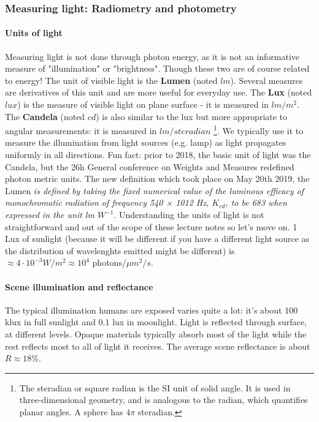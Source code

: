 \subsubsection{Measuring light: Radiometry and photometry}

\paragraph{Units of light} Measuring light is not done through photon energy, as it is not an informative measure of "illumination" or "brightness". Though these two are of course related to energy! 
The unit of visible light is the \textbf{Lumen} (noted $lm$). Several measures are derivatives of this unit and are more useful for everyday use. The \textbf{Lux} (noted $lux$) is the measure of visible light on plane surface - it is measured in $lm/m^2$. The \textbf{Candela} (noted $cd$) is also similar to the lux but more appropriate to angular measurements:  it is measured in $lm/steradian$ \footnote{The steradian or square radian is the SI unit of solid angle. It is used in three-dimensional geometry, and is analogous to the radian, which quantifies planar angles. A sphere has $4\pi$ steradian.}. We typically use it to measure the illumination from light sources (e.g. lamp) as light propagates uniformly in all directions. Fun fact: prior to 2018, the basic unit of light was the Candela, but the 26h General conference on Weights and Measures redefined photon metric units. The new definition which took place on May 20th 2019, the Lumen \textit{is defined by taking the fixed numerical value of the luminous efficacy of monochromatic radiation of frequency 540 × 1012 Hz, $K_{cd}$, to be 683 when expressed in the unit lm $W^{-1}$}. Understanding the units of light is not straightforward and out of the scope of these lecture notes so let's move on. 
1 Lux of sunlight (because it will be different if you have a different light source as the distribution of wavelenghts emitted might be different) is $\approx 4 \cdot 10^{-3} W/m^2 \approx 10^4$ photons/$ \mu m^2 /s$.

\paragraph{Scene illumination and reflectance}
The typical illumination humans are exposed varies quite a lot: it's about 100 klux in full sunlight and 0.1 lux in moonlight. Light is reflected through surface, at different levels. Opaque materials typically absorb most of the light while the rest reflects most to all of light it receives. The average scene reflectance is about $R \approx 18\% $. 

